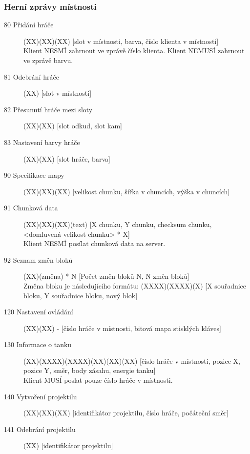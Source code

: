 \documentclass[12pt,a4paper]{article}
\begin{document}
\subsubsection*{Herní zprávy místnosti}
\begin{description}
\item[80 Přidání hráče] (XX)(XX)(XX) [slot v místnosti, barva, číslo klienta v místnosti] \\
Klient NESMÍ zahrnout ve zprávě číslo klienta. Klient NEMUSÍ zahrnout ve zprávě barvu.
\item[81 Odebrání hráče] (XX) [slot v místnosti]
\item[82 Přesunutí hráče mezi sloty] (XX)(XX) [slot odkud, slot kam]
\item[83 Nastavení barvy hráče] (XX)(XX) [slot hráče, barva]

\item[90 Specifikace mapy] (XX)(XX)(XX) [velikost chunku, šířka v chuncích, výška v chuncích]
\item[91 Chunková data] (XX)(XX)(XX)(text) [X chunku, Y chunku, checksum chunku, <domluvená velikost chunku> * X]\\
Klient NESMÍ posílat chunková data na server.
\item[92 Seznam změn bloků] (XX)(změna) * N [Počet změn bloků N, N změn bloků]\\ 
Změna bloku je následujícího formátu: (XXXX)(XXXX)(X) [X souřadnice bloku, Y souřadnice bloku, nový blok]

\item[120 Nastavení ovládání] (XX)(XX) - [číslo hráče v místnosti, bitová mapa stisklých kláves]
\item[130 Informace o tanku] (XX)(XXXX)(XXXX)(XX)(XX)(XX) [číslo hráče v místnosti, pozice X, pozice Y, směr, body zásahu, energie tanku] \\
Klient MUSÍ poslat pouze číslo hráče v místnosti.
\item[140 Vytvoření projektilu] (XX)(XX)(XX) [identifikátor projektilu, číslo hráče, počáteční směr]
\item[141 Odebrání projektilu] (XX) [identifikátor projektilu]
\end{description}




\end{document}
